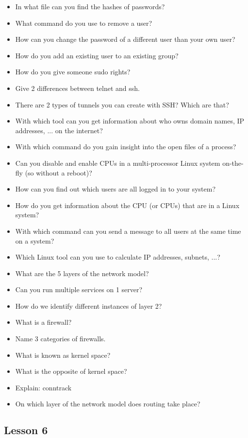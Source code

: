 \documentclass{article}
\begin{document}
\begin{itemize}
    \item In what file can you find the hashes of passwords?
    \item What command do you use to remove a user?
    \item How can you change the password of a different user than your own user?
    \item How do you add an existing user to an existing group?
    \item How do you give someone sudo rights?
    \item Give 2 differences between telnet and ssh.
    \item There are 2 types of tunnels you can create with SSH? Which are that?
    \item With which tool can you get information about who owns domain names, IP addresses, ... on the internet?
    \item With which command do you gain insight into the open files of a process?
    \item Can you disable and enable CPUs in a multi-processor Linux system on-the-fly (so without a reboot)?
    \item How can you find out which users are all logged in to your system?
    \item How do you get information about the CPU (or CPUs) that are in a Linux system?
    \item With which command can you send a message to all users at the same time on a system?
    \item Which Linux tool can you use to calculate IP addresses, subnets, ...?
    \item What are the 5 layers of the network model?
    \item Can you run multiple services on 1 server?
    \item How do we identify different instances of layer 2?
    \item What is a firewall?
    \item Name 3 categories of firewalls.
    \item What is known as kernel space?
    \item What is the opposite of kernel space?
    \item Explain: conntrack
    \item On which layer of the network model does routing take place?
\end{itemize}

\subsection{Lesson 6}
\end{document}
